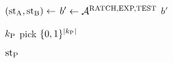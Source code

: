  \algrenewcommand\textproc{}
 \algrenewcommand{}

 \begin{minipage}{.5\linewidth}
   {\fontsize{8}{10}\selectfont
   \begin{algorithmic}[1]
     \State $(\text{st}_\text{A},\text{st}_\text{B}) \gets$ 
     \State $b' \gets \mathcal{A}^{\text{RATCH,EXP,TEST}}$
     \State \Return $b'$
     \EndProcedure
   \end{algorithmic}
   }
 \end{minipage}

 \vline

 \algrenewcommand\textproc{}
 \algrenewcommand{}

 \begin{minipage}{.5\linewidth}
   {\fontsize{8}{10}\selectfont
   \begin{algorithmic}[1]
     \State \Return $k_\text{P}$
     \EndIf
     \State \Return pick $\{0,1\}^{|k_\text{P}|}$ 
     \EndProcedure

     \item[] %

     \State \Return $\text{st}_\text{P}$ 
     \EndProcedure
   \end{algorithmic}
   } 
\end{minipage}%
